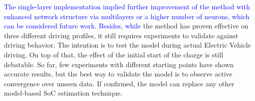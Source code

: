 %
%
\textcolor{blue}{
The single-layer implementation implied further improvement of the method with enhanced network structure via multilayers or a higher number of neurons, which can be considered future work.
Besides, while} the method has proven effective on three different driving profiles, it still requires experiments to validate against driving behavior.
The intention is to test the model during actual Electric Vehicle driving.
On top of that, the effect of the initial start of the charge is still debatable.
So far, few experiments with different starting points have shown accurate results, but the best way to validate the model is to observe active convergence over unseen data.
If confirmed, the model can replace any other model-based SoC estimation technique.
